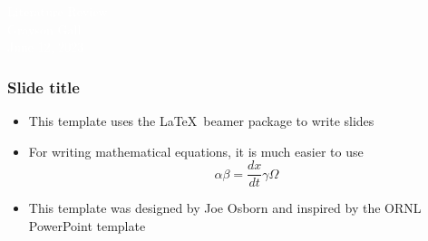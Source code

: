 \documentclass[aspectratio=169, 16pt]{beamer}
\begin{document}
%
%
{
\begin{frame}
	\textcolor{white}{\Huge Literature Review}\\
	\vspace*{0.7cm}
 	\textcolor{white}{\Large Grayson Gall}\\
 	\textcolor{white}{June 12, 2023}

\end{frame}
}



%
%

\begin{frame}
\frametitle{\Large{Slide title}}
	\centering
	\begin{itemize}
		\item This template uses the \LaTeX~beamer package to write slides
		\item For writing mathematical equations, it is much easier to use
		\[
			\alpha\beta = \frac{dx}{dt}\gamma\Omega
		\]
		\item This template was designed by Joe Osborn and inspired by the ORNL PowerPoint template
	\end{itemize}
\end{frame}
\end{document}
